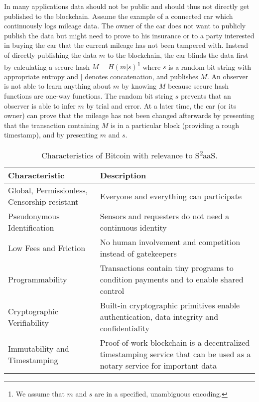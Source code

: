 In many applications data should not be public and should thus not directly get published to the blockchain. Assume the example of a connected car which continuously logs mileage data. The owner of the car does not want to publicly publish the data but might need to prove to his insurance or to a party interested in buying the car that the current mileage has not been tampered with. Instead of directly publishing the data $m$ to the blockchain, the car blinds the data first by calculating a secure hash $M=H(m|s)$\footnote{We assume that $m$ and $s$ are in a specified, unambiguous encoding.} where $s$ is a random bit string with appropriate entropy and $|$ denotes concatenation, and publishes $M$. An observer is not able to learn anything about $m$ by knowing $M$ because secure hash functions are one-way functions. The random bit string $s$ prevents that an observer is able to infer $m$ by trial and error. At a later time, the car (or its owner) can prove that the mileage has not been changed afterwards by presenting that the transaction containing $M$ is in a particular block (providing a rough timestamp), and by presenting $m$ and $s$. 

\begin{table}\footnotesize
  \centering
  \begin{tabularx}{\textwidth}{ X  X }
    \toprule
    Characteristic & Description \\
    \midrule
    Global, Permissionless, Censorship-resistant & Everyone and everything can participate \\ 
    Pseudonymous Identification & Sensors and requesters do not need a continuous identity  \\ 
    Low Fees and Friction & No human involvement and competition instead of gatekeepers \\  
    Programmability & Transactions contain tiny programs to condition payments and to enable shared control \\  
    Cryptographic Verifiability & Built-in cryptographic primitives enable authentication, data integrity and confidentiality \\ 
    Immutability and Timestamping & Proof-of-work blockchain is a decentralized timestamping service that can be used as a notary service for important data \\
    \bottomrule
  \end{tabularx}
  \caption{Characteristics of Bitcoin with relevance to S\textsuperscript{2}aaS.}
  \label{tbl:sensors}
\end{table}

